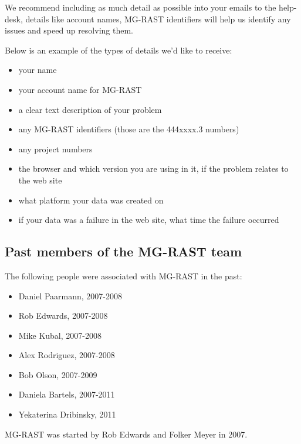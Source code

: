\documentclass[12pt,fullpage]{report}
\begin{document}
We recommend including as much detail as possible into your emails to the help-desk, details like account names, MG-RAST identifiers will help us identify any issues and speed up resolving them. 

Below is an example of the types of details we'd like to receive:
\begin{itemize}
\item your name 
\item your account name for MG-RAST
\item a clear text description of your problem
\item any MG-RAST identifiers (those are the 444xxxx.3 numbers)
\item any project numbers
\item the browser and which version you are using in it, if the problem relates to the web site
\item what platform your data was created on
\item if your data was a failure in the web site, what time the failure occurred

\end{itemize}





\subsection*{Past members of the MG-RAST team}
The following people were associated with MG-RAST in the past:

\begin{itemize}
\item    Daniel Paarmann, 2007-2008
\item    Rob Edwards, 2007-2008
\item    Mike Kubal, 2007-2008
\item    Alex Rodriguez, 2007-2008
\item    Bob Olson, 2007-2009
\item    Daniela Bartels, 2007-2011
\item    Yekaterina Dribinsky, 2011
\end{itemize}

MG-RAST was started by Rob Edwards and Folker Meyer in 2007.

\end{document}
